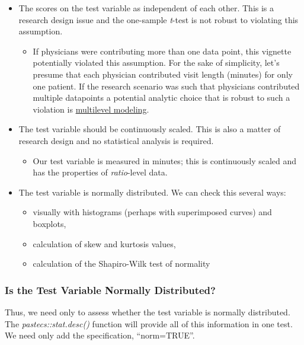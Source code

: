 \documentclass[
  11pt,
]{book}
\providecommand{\tightlist}{%
  \setlength{\itemsep}{0pt}\setlength{\parskip}{0pt}}
\begin{document}
\begin{itemize}
\tightlist
\item
  The scores on the test variable as independent of each other. This is a research design issue and the one-sample \emph{t}-test is not robust to violating this assumption.

  \begin{itemize}
  \tightlist
  \item
    If physicians were contributing more than one data point, this vignette potentially violated this assumption. For the sake of simplicity, let's presume that each physician contributed visit length (minutes) for only one patient. If the research scenario was such that physicians contributed multiple datapoints a potential analytic choice that is robust to such a violation is \href{https://lhbikos.github.io/MultilevelModeling/}{multilevel modeling}.
  \end{itemize}
\item
  The test variable should be continuously scaled. This is also a matter of research design and no statistical analysis is required.

  \begin{itemize}
  \tightlist
  \item
    Our test variable is measured in minutes; this is continuously scaled and has the properties of \emph{ratio}-level data.
  \end{itemize}
\item
  The test variable is normally distributed. We can check this several ways:

  \begin{itemize}
  \tightlist
  \item
    visually with histograms (perhaps with superimposed curves) and boxplots,
  \item
    calculation of skew and kurtosis values,
  \item
    calculation of the Shapiro-Wilk test of normality
  \end{itemize}
\end{itemize}

\hypertarget{is-the-test-variable-normally-distributed}{%
\subsubsection{Is the Test Variable Normally Distributed?}\label{is-the-test-variable-normally-distributed}}

Thus, we need only to assess whether the test variable is normally distributed. The \emph{pastecs::stat.desc()} function will provide all of this information in one test. We need only add the specification, ``norm=TRUE''.
\end{document}
